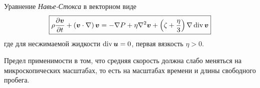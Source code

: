 Уравнение \textit{Навье-Стокса} в векторном виде
\begin{equation}
\boxed{
	\rho \frac{\partial \boldsymbol{v}}{\partial t}  + \left(\boldsymbol{v} \cdot \nabla\right) \boldsymbol{v} = - \nabla P + \eta \nabla^2 \boldsymbol{v} + \left(\zeta + \frac{\eta}{3}\right) \nabla \mathop{\mathrm{div}}\nolimits \boldsymbol{v}
}
\end{equation}
где для несжимаемой жидкости $\mathop{\mathrm{div}}\nolimits \boldsymbol{u} =0$, первая вязкость $\eta > 0$. 

Предел применимости в том, что средняя скорость должна слабо меняться на микроскопических масштабах, то есть на масштабах времени и длины  свободного пробега.
